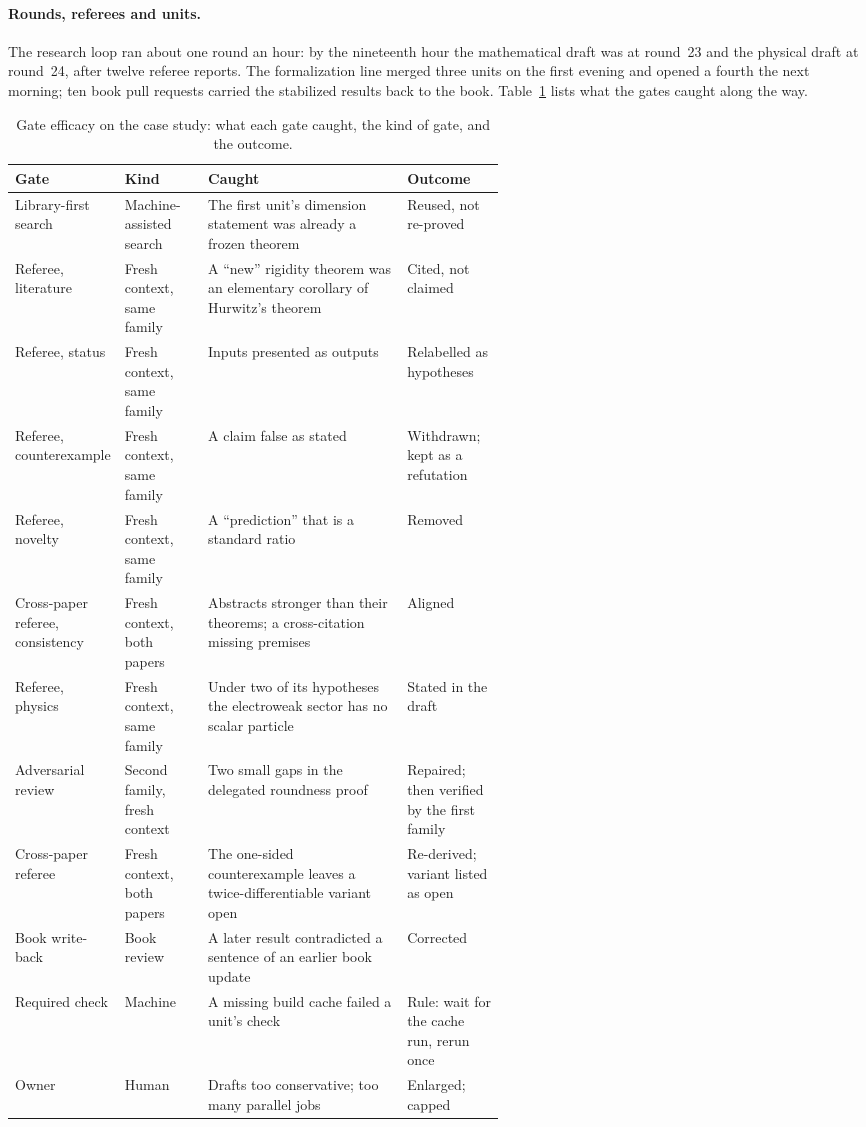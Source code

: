 \documentclass[11pt]{article}
\begin{document}
\paragraph{Rounds, referees and units.} The research loop ran about one round
an hour: by the nineteenth hour the mathematical draft was at round~23 and
the physical draft at round~24, after twelve referee reports. The
formalization line merged three units on the first evening and opened a
fourth the next morning; ten book pull requests carried the stabilized
results back to the book. Table~\ref{tab:caught} lists what the gates caught
along the way.

\begin{table}[htbp]
\centering\scriptsize
\caption{Gate efficacy on the case study: what each gate caught, the kind of
gate, and the outcome.}
\label{tab:caught}
\begin{tabularx}{\linewidth}{@{}>{\raggedright\arraybackslash}p{0.2\linewidth}>{\raggedright\arraybackslash}p{0.17\linewidth}>{\raggedright\arraybackslash}X>{\raggedright\arraybackslash}p{0.2\linewidth}@{}}
\toprule
Gate & Kind & Caught & Outcome \\
\midrule
Library-first search & Machine-assisted search & The first unit's dimension statement was already a frozen theorem & Reused, not re-proved \\
Referee, literature & Fresh context, same family & A ``new'' rigidity theorem was an elementary corollary of Hurwitz's theorem & Cited, not claimed \\
Referee, status & Fresh context, same family & Inputs presented as outputs & Relabelled as hypotheses \\
Referee, counterexample & Fresh context, same family & A claim false as stated & Withdrawn; kept as a refutation \\
Referee, novelty & Fresh context, same family & A ``prediction'' that is a standard ratio & Removed \\
Cross-paper referee, consistency & Fresh context, both papers & Abstracts stronger than their theorems; a cross-citation missing premises & Aligned \\
Referee, physics & Fresh context, same family & Under two of its hypotheses the electroweak sector has no scalar particle & Stated in the draft \\
Adversarial review & Second family, fresh context & Two small gaps in the delegated roundness proof & Repaired; then verified by the first family \\
Cross-paper referee & Fresh context, both papers & The one-sided counterexample leaves a twice-differentiable variant open & Re-derived; variant listed as open \\
Book write-back & Book review & A later result contradicted a sentence of an earlier book update & Corrected \\
Required check & Machine & A missing build cache failed a unit's check & Rule: wait for the cache run, rerun once \\
Owner & Human & Drafts too conservative; too many parallel jobs & Enlarged; capped \\
\bottomrule
\end{tabularx}
\end{table}
\end{document}
